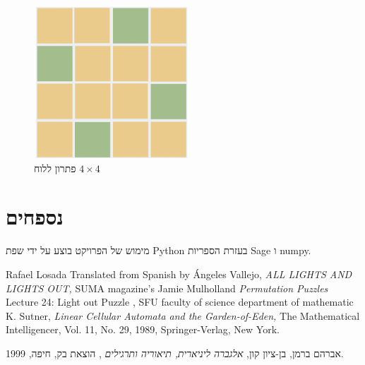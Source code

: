 \documentclass[12pt,leqno]{article}
\theoremstyle{theoremdd}
\begin{document}
\begin{figure}[ht]
    \caption{פתרון ללוח 
    $4 \times 4$}
    \label{fig:4x4_have_min_sol}
    \centering
    \includegraphics[width=.3\textwidth,keepaspectratio]{images/4x4_sol.PNG}
\end{figure}

\newpage
\section{נספחים}
מימוש של הפרויקט בוצע על ידי 
שפת 
{Python}
בעזרת הספריות
{Sage}
ו
numpy.

\newpage
\begin{thebibliography}{99}
\begin{english}
Rafael Losada
Translated from Spanish by Ángeles Vallejo,
\emph{
    ALL LIGHTS AND LIGHTS OUT,
}
SUMA magazine’s 
Jamie Mulholland
\emph{
    Permutation Puzzles
}
Lecture 24: Light out Puzzle , SFU faculty of science department of mathematic
K. Sutner, \emph{Linear Cellular Automata and the Garden-of-Eden,} The Mathematical Intelligencer, Vol. 11, No. 29, 1989, Springer-Verlag, New York.		
\end{english}
אברהם ברמן, בן-ציון קון, 
\emph{
אלגברה ליניארית, תיאוריה ותרגילים
}
, הוצאת בק, חיפה, 1999.
\end{thebibliography}
\end{document}
